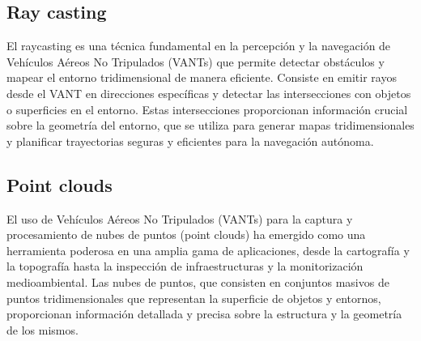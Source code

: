 \subsection{Ray casting}

El raycasting es una técnica fundamental en la percepción y la navegación de Vehículos Aéreos No Tripulados (VANTs) que permite detectar obstáculos y mapear el entorno tridimensional de manera eficiente. Consiste en emitir rayos desde el VANT en direcciones específicas y detectar las intersecciones con objetos o superficies en el entorno. Estas intersecciones proporcionan información crucial sobre la geometría del entorno, que se utiliza para generar mapas tridimensionales y planificar trayectorias seguras y eficientes para la navegación autónoma.


\subsection{Point clouds}

El uso de Vehículos Aéreos No Tripulados (VANTs) para la captura y procesamiento de nubes de puntos (point clouds) ha emergido como una herramienta poderosa en una amplia gama de aplicaciones, desde la cartografía y la topografía hasta la inspección de infraestructuras y la monitorización medioambiental. Las nubes de puntos, que consisten en conjuntos masivos de puntos tridimensionales que representan la superficie de objetos y entornos, proporcionan información detallada y precisa sobre la estructura y la geometría de los mismos.



